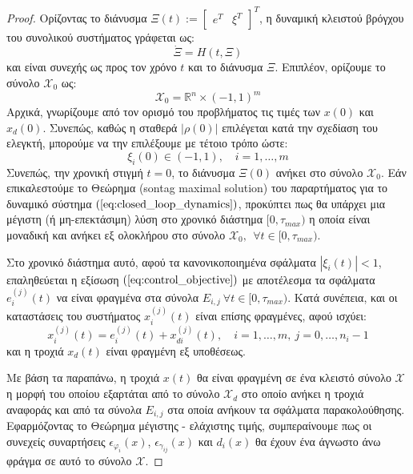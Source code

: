 \begin{proof}
Ορίζοντας το διάνυσμα $\Xi(t) := \begin{bmatrix}e^T & \xi^T \end{bmatrix}^T$, η δυναμική κλειστού βρόγχου του συνολικού συστήματος γράφεται ως:
\begin{equation}
	\dot{\Xi} = H(t, \Xi )
	\label{eq:closed_loop_dynamics}
\end{equation}
και είναι συνεχής ως προς τον χρόνο $t$ και το διάνυσμα $\Xi$. Επιπλέον, ορίζουμε το σύνολο $\mathcal{X}_0$ ως:
\begin{equation}
	\mathcal{X}_0 = \mathbb{R}^n \times (-1,1)^m
	\label{eq:initial_solution_set}
\end{equation}
Αρχικά, γνωρίζουμε από τον ορισμό του προβλήματος τις τιμές των $x(0)$ και $x_d(0)$. Συνεπώς, καθώς η σταθερά  $| \rho(0) |$ επιλέγεται κατά την σχεδίαση του ελεγκτή, μπορούμε να την επιλέξουμε με τέτοιο τρόπο ώστε:
\begin{equation*}
	\xi_i(0) \in (-1,1), \quad i=1,\dots,m
\end{equation*}
Συνεπώς, την χρονική στιγμή $t=0$, το διάνυσμα $\Xi(0)$ ανήκει στο σύνολο $\mathcal{X}_0$. Εάν επικαλεστούμε το Θεώρημα (sontag maximal solution) του παραρτήματος για το δυναμικό σύστημα $(\ref{eq:closed_loop_dynamics})$, προκύπτει πως θα υπάρχει μια μέγιστη (ή μη-επεκτάσιμη) λύση στο χρονικό διάστημα $[0,\tau_{max})$ η οποία είναι μοναδική και ανήκει εξ ολοκλήρου στο σύνολο $\mathcal{X}_0, \: \: \forall t \in [0, \tau_{max})$.

Στο χρονικό διάστημα αυτό, αφού τα κανονικοποιημένα σφάλματα $| \xi_i(t) | < 1$, επαληθεύεται η εξίσωση $(\ref{eq:control_objective})$ με αποτέλεσμα τα σφάλματα $e_i^{(j)}(t)$ να είναι φραγμένα στα σύνολα $E_{i,j} \: \forall t \in [0, \tau_{max})$. Κατά συνέπεια, και οι καταστάσεις του συστήματος $x_i^{(j)}(t)$ είναι επίσης φραγμένες, αφού ισχύει:
\begin{equation*}
	x_i^{(j)}(t) = e_i^{(j)}(t) + x_{di}^{(j)}(t), 
	\quad i= 1,\dots,m , \: j = 0,\dots, n_i - 1
\end{equation*}
και η τροχιά $x_d(t)$ είναι φραγμένη εξ υποθέσεως.

Με βάση τα παραπάνω, η τροχιά $x(t)$ θα είναι φραγμένη σε ένα κλειστό σύνολο $\mathcal{X}$ η μορφή του οποίου εξαρτάται από το σύνολο $\mathcal{X}_d$ στο οποίο ανήκει η τροχιά αναφοράς και από τα σύνολα $E_{i,j}$ στα οποία ανήκουν τα σφάλματα παρακολούθησης. Εφαρμόζοντας το Θεώρημα μέγιστης - ελάχιστης τιμής, συμπεραίνουμε πως οι συνεχείς συναρτήσεις $\epsilon_{\varphi_i}(x)$, $\epsilon_{\gamma_{ij}}(x)$ και $d_i(x)$ θα έχουν ένα άγνωστο άνω φράγμα 
σε αυτό το σύνολο $\mathcal{X}$.


\end{proof}
